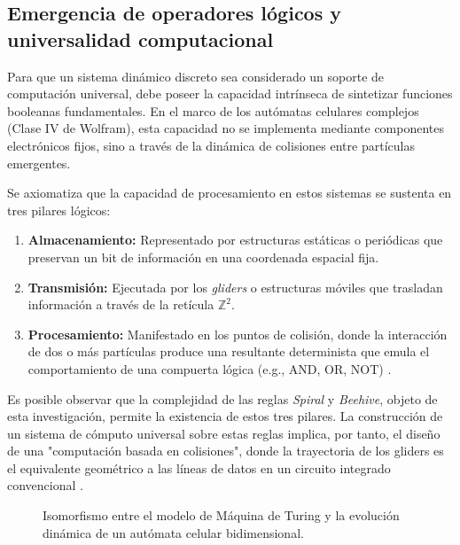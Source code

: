 \subsection{Emergencia de operadores lógicos y universalidad computacional}

Para que un sistema dinámico discreto sea considerado un soporte de computación universal, debe poseer la capacidad intrínseca de sintetizar funciones booleanas fundamentales. En el marco de los autómatas celulares complejos (Clase IV de Wolfram), esta capacidad no se implementa mediante componentes electrónicos fijos, sino a través de la dinámica de colisiones entre partículas emergentes.

Se axiomatiza que la capacidad de procesamiento en estos sistemas se sustenta en tres pilares lógicos:
\begin{enumerate}
    \item \textbf{Almacenamiento:} Representado por estructuras estáticas o periódicas que preservan un bit de información en una coordenada espacial fija.
    \item \textbf{Transmisión:} Ejecutada por los \textit{gliders} o estructuras móviles que trasladan información a través de la retícula $\mathbb{Z}^2$.
    \item \textbf{Procesamiento:} Manifestado en los puntos de colisión, donde la interacción de dos o más partículas produce una resultante determinista que emula el comportamiento de una compuerta lógica (e.g., AND, OR, NOT) \cite{Toffoli1987}.
\end{enumerate}

Es posible observar que la complejidad de las reglas \textit{Spiral} y \textit{Beehive}, objeto de esta investigación, permite la existencia de estos tres pilares. La construcción de un sistema de cómputo universal sobre estas reglas implica, por tanto, el diseño de una "computación basada en colisiones", donde la trayectoria de los gliders es el equivalente geométrico a las líneas de datos en un circuito integrado convencional \cite{Adamatzky1994}.

\begin{figure}[h]
\centering
\caption{Isomorfismo entre el modelo de Máquina de Turing y la evolución dinámica de un autómata celular bidimensional.}
\label{fig:equivalencia_turing}
\end{figure}


